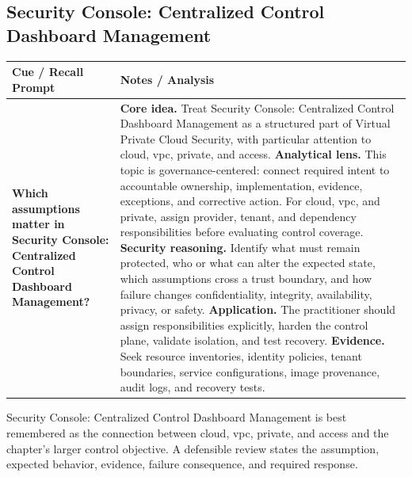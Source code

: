 \documentclass[11pt]{article}
\newcommand{\CornellHeader}{%
\rowcolor{Navy}\color{white}\bfseries Cue / Recall Prompt & \color{white}\bfseries Notes / Analysis\\\hline}
\newcommand{\CornellRow}[2]{%
\cellcolor{CueGray}\RaggedRight\textbf{#1} & \RaggedRight #2\\\hline}
\begin{document}
\subsection*{Security Console: Centralized Control Dashboard Management}
\begin{longtable}{>{\RaggedRight\arraybackslash}p{}|>{\RaggedRight\arraybackslash}p{}}
\CornellHeader
\CornellRow{Which assumptions matter in Security Console: Centralized Control Dashboard Management?}{\textbf{Core idea.} Treat Security Console: Centralized Control Dashboard Management as a structured part of Virtual Private Cloud Security, with particular attention to cloud, vpc, private, and access. \textbf{Analytical lens.} This topic is governance-centered: connect required intent to accountable ownership, implementation, evidence, exceptions, and corrective action. For cloud, vpc, and private, assign provider, tenant, and dependency responsibilities before evaluating control coverage. \textbf{Security reasoning.} Identify what must remain protected, who or what can alter the expected state, which assumptions cross a trust boundary, and how failure changes confidentiality, integrity, availability, privacy, or safety. \textbf{Application.} The practitioner should assign responsibilities explicitly, harden the control plane, validate isolation, and test recovery. \textbf{Evidence.} Seek resource inventories, identity policies, tenant boundaries, service configurations, image provenance, audit logs, and recovery tests.}
\end{longtable}
\begin{topicsummary}
Security Console: Centralized Control Dashboard Management is best remembered as the connection between cloud, vpc, private, and access and the chapter's larger control objective. A defensible review states the assumption, expected behavior, evidence, failure consequence, and required response.
\end{topicsummary}
\end{document}
